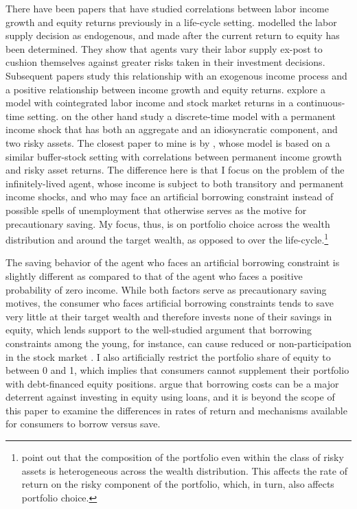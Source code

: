 There have been papers that have studied correlations between labor income growth and equity returns previously in a life-cycle setting. \citet{Bodie1992} modelled the labor supply decision as endogenous, and made after the current return to equity has been determined. They show that agents vary their labor supply ex-post to cushion themselves against greater risks taken in their investment decisions. Subsequent papers study this relationship with an exogenous income process and a positive relationship between income growth and equity returns. \citet{Benzoni2007} explore a model with cointegrated labor income and stock market returns in a continuous-time setting. \citet{Bagliano2014} on the other hand study a discrete-time model with a permanent income shock that has both an aggregate and an idiosyncratic component, and two risky assets. The closest paper to mine is by \citet{Viceira2001}, whose model is based on a similar buffer-stock setting with correlations between permanent income growth and risky asset returns. The difference here is that I focus on the problem of the infinitely-lived agent, whose income is subject to both transitory and permanent income shocks, and who may face an artificial borrowing constraint instead of possible spells of unemployment that otherwise serves as the motive for precautionary saving. My focus, thus, is on portfolio choice across the wealth distribution and around the target wealth, as opposed to over the life-cycle.\footnote{\citet{Fagereng2020} point out that the composition of the portfolio even within the class of risky assets is heterogeneous across the wealth distribution. This affects the rate of return on the risky component of the portfolio, which, in turn, also affects portfolio choice.}

The saving behavior of the agent who faces an artificial borrowing constraint is slightly different as compared to that of the agent who faces a positive probability of zero income. While both factors serve as precautionary saving motives, the consumer who faces artificial borrowing constraints tends to save very little at their target wealth and therefore invests none of their savings in equity, which lends support to the well-studied argument that borrowing constraints among the young, for instance, can cause reduced or non-participation in the stock market \citep{Constantinides2002, Haliassos2002, Kogan2007, Jang2015, Harenberg2018}. I also artificially restrict the portfolio share of equity to between 0 and 1, which implies that consumers cannot supplement their portfolio with debt-financed equity positions. \citet{Davis2006} argue that borrowing costs can be a major deterrent against investing in equity using loans, and it is beyond the scope of this paper to examine the differences in rates of return and mechanisms available for consumers to borrow versus save.

